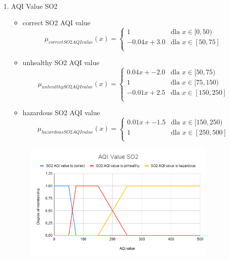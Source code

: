 \documentclass{classrep}
\begin{document}
{{\begin{enumerate}
                \item AQI Value SO2
                \begin{itemize}
                    \item correct SO2 AQI value
\begin{displaymath}
\mu_{correct SO2 AQI value}(x) = \left\{ \begin{array}{ll}
1 & \textrm{dla $x \in [0, 50)$}\\
-0.04x + 3.0 & \textrm{dla $x \in [50, 75]$}\\
\end{array} \right.
\end{displaymath}
                    \item unhealthy SO2 AQI value
\begin{displaymath}
\mu_{unhealthy SO2 AQI value}(x) = \left\{ \begin{array}{ll}
0.04x + -2.0 & \textrm{dla $x \in [50, 75)$}\\
1 & \textrm{dla $x \in [75, 150)$}\\
-0.01x + 2.5 & \textrm{dla $x \in [150, 250]$}\\
\end{array} \right.
\end{displaymath}
                    \item hazardous SO2 AQI value
\begin{displaymath}
\mu_{hazardous SO2 AQI value}(x) = \left\{ \begin{array}{ll}
0.01x + -1.5 & \textrm{dla $x \in [150, 250)$}\\
1 & \textrm{dla $x \in [250, 500]$}\\
\end{array} \right.
\end{displaymath}
                \end{itemize}
                \begin{figure}[!htbp]
                    \centering
                    \includegraphics[width=0.9\textwidth]{img/theory/AQIValueSO2.png}
                    \caption{}
                \end{figure}
                \FloatBarrier
            \end{enumerate}
        }

}
\end{document}
